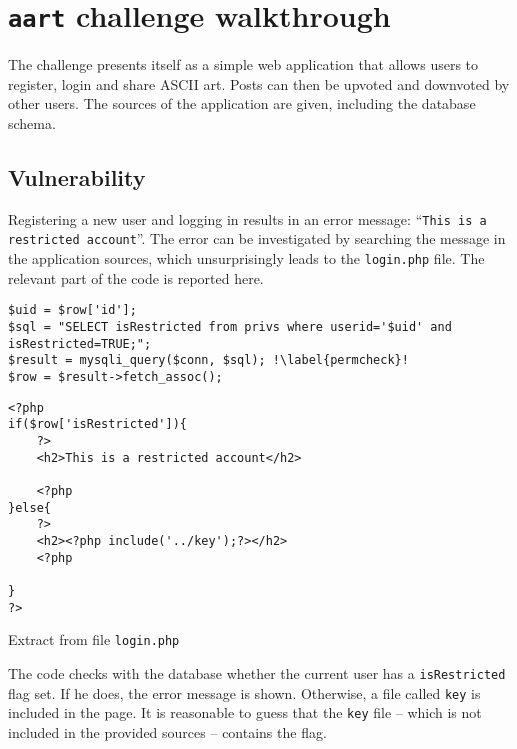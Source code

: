 \section{\texttt{aart} challenge walkthrough}

The challenge presents itself as a simple web application that allows users to register, login and share ASCII art. Posts can then be upvoted and downvoted by other users. The sources of the application are given, including the database schema. \\

\subsection{Vulnerability}
 
Registering a new user and logging in results in an error message: ``\texttt{This is a restricted account}''. The error can be investigated by searching the message in the application sources, which unsurprisingly leads to the \texttt{login.php} file. The relevant part of the code is reported here.

\begin{listing}[H]
\begin{verbatim}
$uid = $row['id'];
$sql = "SELECT isRestricted from privs where userid='$uid' and isRestricted=TRUE;";
$result = mysqli_query($conn, $sql); !\label{permcheck}!
$row = $result->fetch_assoc();
\end{verbatim}

\vspace{-20pt}
\newenvironment{uglyworkaround}{\par\color{white}}{\par}
\begin{uglyworkaround}
\renewcommand{\theFancyVerbLine}{\rmfamily\textcolor{black}{\tiny{\arabic{FancyVerbLine}}}}
\begin{verbatim}
<?php
if($row['isRestricted']){
    ?>
    <h2>This is a restricted account</h2>

    <?php
}else{
    ?>
    <h2><?php include('../key');?></h2>
    <?php

}
?>
\end{verbatim}
\end{uglyworkaround}
\caption{Extract from file \texttt{login.php}}
\end{listing}

The code checks with the database whether the current user has a \texttt{isRestricted} flag set. If he does, the error message is shown. Otherwise, a file called \texttt{key} is included in the page. It is reasonable to guess that the \texttt{key} file -- which is not included in the provided sources -- contains the flag. \\

